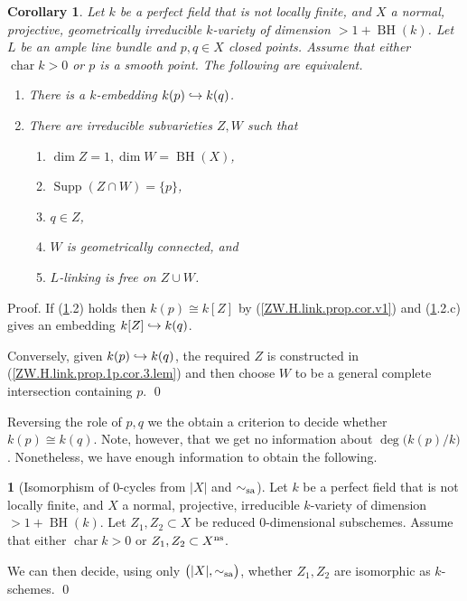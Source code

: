 \documentclass{amsart}
\newtheorem{cor}[thm]{Corollary}
\theoremstyle{definition}
\newtheorem{say}[thm]{}
\theoremstyle{remark}
\newcommand{\supp}[0]{\operatorname{Supp}}
\newcommand{\chr}[0]{\operatorname{char}}
\def\into{\DOTSB\lhook\joinrel\to}
\newcommand{\BH}[0]{\operatorname{BH}}
\newcommand{\simsa}[0]{\sim_{\rm sa}}
\begin{document}
\begin{cor} \label{ZW.H.link.prop.1p.cor.3}
Let $k$ be a perfect 
field  that  is not locally finite, and 
 $X$  a  normal, projective, geometrically  irreducible  $k$-variety of dimension $>1+\BH(k)$. 
Let $L$ be an ample line bundle and $p,q\in X$   closed points. 
Assume that either $\chr k>0$ or $p$ is  a smooth point. 
The following are equivalent.
\begin{enumerate}
\item There is a $k$-embedding $k(p)\into k(q)$.
\item  There are irreducible  subvarieties
$Z, W$  such that 
\begin{enumerate}
\item  $\dim Z=1, \dim W= \BH(X)$, 
\item $\supp(Z\cap W)=\{p\}$,
\item   $q\in Z$, 
\item $W$ is geometrically connected,  and
\item $L$-linking is free on $Z\cup W$.
\end{enumerate}
\end{enumerate}
\end{cor}

Proof. If (\ref{ZW.H.link.prop.1p.cor.3}.2) holds then 
$k(p)\cong k[Z]$ by (\ref{ZW.H.link.prop.cor.v1}) and (\ref{ZW.H.link.prop.1p.cor.3}.2.c) gives an embedding $k[Z]\into k(q)$.

Conversely, given $k(p)\into k(q)$, the required $Z$ is constructed in (\ref{ZW.H.link.prop.1p.cor.3.lem}) and then choose $W$ to be  a general complete intersection  containing $p$. \qed

\medskip

Reversing the role of $p,q$ we the obtain a criterion to decide whether
$k(p)\cong k(q)$. Note, however, that we get no information about $\deg \bigl(k(p)/k\bigr)$. Nonetheless, we have enough information  to obtain the following.

\begin{say}[Isomorphism of 0-cycles from  $|X|$ and $\simsa$] \label{iso.0-cyc.sinsa.say}
Let $k$ be a perfect field  that  is not locally finite, and 
 $X$  a  normal, projective, irreducible  $k$-variety of dimension $>1+\BH(k)$.   Let $Z_1, Z_2\subset X$ be reduced 0-dimensional subschemes.
Assume that either $\chr k>0$ or $Z_1, Z_2\subset X^{\rm ns}$.

We can then decide, using only $\bigl(|X|,\simsa\bigr)$, whether
 $Z_1, Z_2$ are isomorphic as $k$-schemes.  \qed
\end{say}
\end{document}
